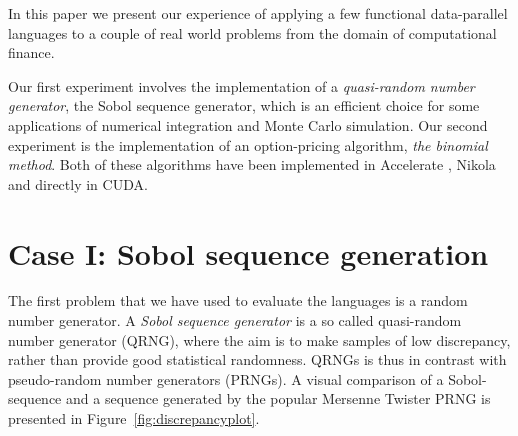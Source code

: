\documentclass[preprint]{sigplanconf}
\begin{document}
In this paper we present our experience of applying a few functional
data-parallel languages to a couple of real world problems from the
domain of computational finance.

Our first experiment involves the implementation of a
\emph{quasi-random number generator}, the Sobol sequence generator,
which is an efficient choice for some applications of numerical
integration and Monte Carlo simulation. Our second experiment is the
implementation of an option-pricing algorithm, \emph{the binomial
  method}. Both of these algorithms have been implemented in
Accelerate \cite{chakravarty2011accelerating}, Nikola
\cite{mainland2010nikola} and directly in CUDA.

\section{Case I: Sobol sequence generation}
The first problem that we have used to evaluate the languages is a
random number generator. A \emph{Sobol sequence generator} is a so
called quasi-random number generator (QRNG), where the aim is to make
samples of low discrepancy, rather than provide good statistical
randomness. QRNGs is thus in contrast with pseudo-random number
generators (PRNGs). A visual comparison of a Sobol-sequence and a
sequence generated by the popular Mersenne Twister PRNG is presented
in Figure~\ref{fig:discrepancyplot}.
\end{document}
